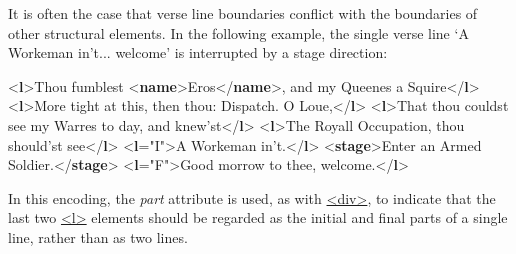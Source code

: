 It is often the case that verse line boundaries conflict with the boundaries of other structural elements. In the following example, the single verse line ‘A Workeman in't... welcome’ is interrupted by a stage direction: \par\bgroup{}\exampleFont \begin{shaded}\noindent\mbox{}{<\textbf{l}>}Thou fumblest {<\textbf{name}>}Eros{</\textbf{name}>}, and my Queenes a Squire{</\textbf{l}>}\mbox{}\newline 
{<\textbf{l}>}More tight at this, then thou: Dispatch. O Loue,{</\textbf{l}>}\mbox{}\newline 
{<\textbf{l}>}That thou couldst see my Warres to day, and knew'st{</\textbf{l}>}\mbox{}\newline 
{<\textbf{l}>}The Royall Occupation, thou should'st see{</\textbf{l}>}\mbox{}\newline 
{<\textbf{l}\hspace*{1em}{part}="{I}">}A Workeman in't.{</\textbf{l}>}\mbox{}\newline 
{<\textbf{stage}>}Enter an Armed Soldier.{</\textbf{stage}>}\mbox{}\newline 
{<\textbf{l}\hspace*{1em}{part}="{F}">}Good morrow to thee, welcome.{</\textbf{l}>}\end{shaded}\egroup\par \noindent  In this encoding, the {\itshape part} attribute is used, as with \hyperref[TEI.div]{<div>}, to indicate that the last two \hyperref[TEI.l]{<l>} elements should be regarded as the initial and final parts of a single line, rather than as two lines.\par
